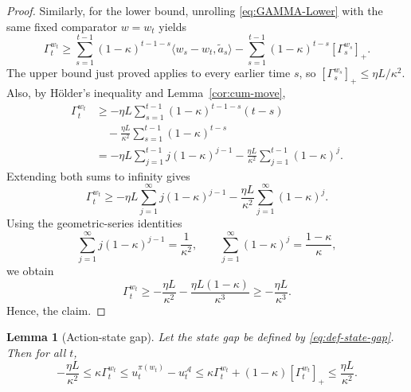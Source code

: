 \documentclass[11pt]{article}
\newtheorem{lemma}{Lemma}
\begin{document}
\begin{proof}
Similarly, for the lower bound, unrolling \eqref{eq:GAMMA-Lower} with the same fixed comparator $w=w_t$ yields
\[
\Gamma_t^{w_t}
\ge
\sum_{s=1}^{t-1}(1-\kappa)^{t-1-s}\langle w_s-w_t,\widetilde a_s\rangle
-
\sum_{s=1}^{t-1}(1-\kappa)^{t-s}[\Gamma_s^{w_s}]_+.
\]
The upper bound just proved applies to every earlier time $s$, so $[\Gamma_s^{w_s}]_+\le \eta L/\kappa^2$. Also, by Hölder's inequality and Lemma~\ref{cor:cum-move},
\begin{align*}
\Gamma_t^{w_t}
&\ge
-\eta L\sum_{s=1}^{t-1}(1-\kappa)^{t-1-s}(t-s) \\
&\quad -\frac{\eta L}{\kappa^2}\sum_{s=1}^{t-1}(1-\kappa)^{t-s} \\
&= -\eta L\sum_{j=1}^{t-1} j(1-\kappa)^{j-1}
 -\frac{\eta L}{\kappa^2}\sum_{j=1}^{t-1}(1-\kappa)^j.
\end{align*}
Extending both sums to infinity gives
\[
\Gamma_t^{w_t}
\ge
-\eta L\sum_{j=1}^{\infty} j(1-\kappa)^{j-1}
-\frac{\eta L}{\kappa^2}\sum_{j=1}^{\infty}(1-\kappa)^j.
\]
Using the geometric-series identities
\[
\sum_{j=1}^{\infty} j(1-\kappa)^{j-1} = \frac{1}{\kappa^2},
\qquad
\sum_{j=1}^{\infty}(1-\kappa)^j = \frac{1-\kappa}{\kappa},
\]
we obtain
\[
\Gamma_t^{w_t}
\ge
-\frac{\eta L}{\kappa^2}
-\frac{\eta L(1-\kappa)}{\kappa^3}
\ge
-\frac{\eta L}{\kappa^3}.
\]
Hence, the claim.
\end{proof}

\begin{lemma}[Action-state gap]
\label{lem:u-gap-by-b-gap-eff}
Let the state gap be defined by \eqref{eq:def-state-gap}. Then for all \(t\),
\[
-\frac{\eta L}{\kappa^2}
\le
\kappa\Gamma_t^{w_t}
\le
u_t^{\pi(w_t)}-u_t^{\mathcal A}
\le
\kappa\Gamma_t^{w_t}+(1-\kappa)[\Gamma_t^{w_t}]_+
\le
\frac{\eta L}{\kappa^2}.
\]
\end{lemma}
\end{document}
